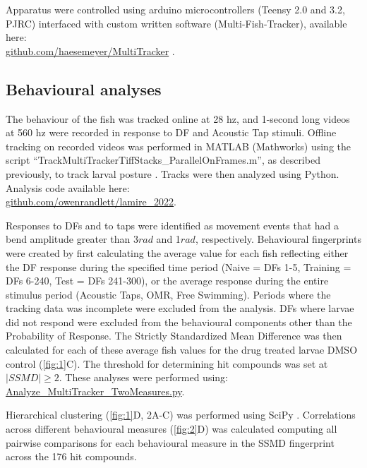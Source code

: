 \documentclass[9pt,lineno]{RandlettLab_elife}
\begin{document}
Apparatus were controlled using arduino microcontrollers (Teensy 2.0 and 3.2, PJRC) interfaced with custom written software (Multi-Fish-Tracker), available here: \\
\href{https://github.com/haesemeyer/MultiTracker}{github.com/haesemeyer/MultiTracker} . 

\subsection{Behavioural analyses}

The behaviour of the fish was tracked online at 28 hz, and 1-second long videos at 560 hz were recorded in response to DF and Acoustic Tap stimuli. Offline tracking on recorded videos was performed in MATLAB (Mathworks) using the script “TrackMultiTrackerTiffStacks\_ParallelOnFrames.m”, as described previously, to track larval posture \cite{Randlett2019-fi}. Tracks were then analyzed using Python. Analysis code available here: \\
\href{https://github.com/owenrandlett/lamire_2022}{github.com/owenrandlett/lamire\_2022}.

Responses to DFs and to taps were identified as movement events that had a bend amplitude greater than 3$rad$ and 1$rad$, respectively. Behavioural fingerprints were created by first calculating the average value for each fish reflecting either the DF response during the specified time period (Naive = DFs 1-5, Training = DFs 6-240, Test = DFs 241-300), or the average response during the entire stimulus period (Acoustic Taps, OMR, Free Swimming). Periods where the tracking data was incomplete were excluded from the analysis. DFs where larvae did not respond were excluded from the behavioural components other than the Probability of Response. The Strictly Standardized Mean Difference was then calculated for each of these average fish values for the drug treated larvae DMSO control (\autoref{fig:1}C). The threshold for determining hit compounds was set at $|SSMD| \geq 2$. These analyses were performed using: 
\\ \href{https://github.com/owenrandlett/lamire_2022/blob/main/Analyze_MultiTracker_TwoMeasures.py}{Analyze\_MultiTracker\_TwoMeasures.py}. 

Hierarchical clustering (\autoref{fig:1}D, 2A-C) was performed using SciPy \cite{Virtanen2020-sz}. Correlations across different behavioural measures (\autoref{fig:2}D) was calculated computing all pairwise comparisons for each behavioural measure in the SSMD fingerprint across the 176 hit compounds. 
\end{document}
